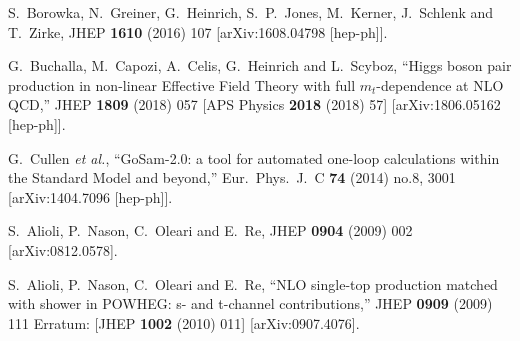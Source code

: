 \documentclass[paper]{JHEP3}
\begin{document}
\begin{thebibliography}{10}
  S.~Borowka, N.~Greiner, G.~Heinrich, S.~P.~Jones, M.~Kerner, J.~Schlenk and T.~Zirke,
  JHEP {\bf 1610} (2016) 107
  [arXiv:1608.04798 [hep-ph]].

  G.~Buchalla, M.~Capozi, A.~Celis, G.~Heinrich and L.~Scyboz,
  ``Higgs boson pair production in non-linear Effective Field Theory with full $m_t$-dependence at NLO QCD,''
  JHEP {\bf 1809} (2018) 057
   [APS Physics {\bf 2018} (2018) 57]
  [arXiv:1806.05162 [hep-ph]].
  
  G.~Cullen {\it et al.},
  ``GoSam-2.0: a tool for automated one-loop calculations within the Standard Model and beyond,''
  Eur.\ Phys.\ J.\ C {\bf 74} (2014) no.8,  3001
  [arXiv:1404.7096 [hep-ph]].

  S.~Alioli, P.~Nason, C.~Oleari and E.~Re,
  JHEP {\bf 0904} (2009) 002
  [arXiv:0812.0578].

  S.~Alioli, P.~Nason, C.~Oleari and E.~Re,
  ``NLO single-top production matched with shower in POWHEG: s- and t-channel contributions,''
  JHEP {\bf 0909} (2009) 111
   Erratum: [JHEP {\bf 1002} (2010) 011]
  [arXiv:0907.4076].
  
 
\end{thebibliography}
\end{document}
